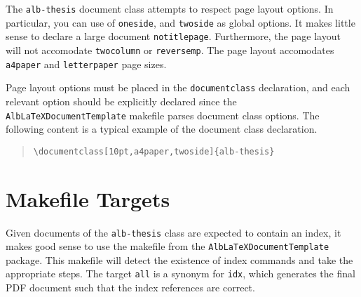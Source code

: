 \documentclass[11pt,a4paper,oneside,titlepage]{alb-corp}
\begin{document}
The \texttt{alb-thesis} document class attempts to respect page layout
options.  In particular, you can use of \texttt{oneside}, and
\texttt{twoside} as global options.  It makes little sense to declare a
large document \texttt{notitlepage}.  Furthermore, the page layout will
not accomodate \texttt{twocolumn} or \texttt{reversemp}.  The page
layout accomodates \texttt{a4paper} and \texttt{letterpaper} page sizes.

Page layout options must be placed in the \texttt{documentclass}
declaration, and each relevant option should be explicitly declared
since the \texttt{AlbLaTeXDocumentTemplate} makefile parses document
class options.  The following content is a typical example of the
document class declaration.
\begin{quote}
\begin{verbatim}
\documentclass[10pt,a4paper,twoside]{alb-thesis}
\end{verbatim}
\end{quote}




\section{Makefile Targets}
\label{sec:alb-thesis-layout-documentation:makef-targ}

Given documents of the \texttt{alb-thesis} class are expected to contain
an index, it makes good sense to use the makefile from the
\texttt{AlbLaTeXDocumentTemplate} package.  This makefile will detect
the existence of index commands and take the appropriate steps.  The
target \texttt{all} is a synonym for \texttt{idx}, which generates the
final PDF document such that the index references are correct.
\end{document}
